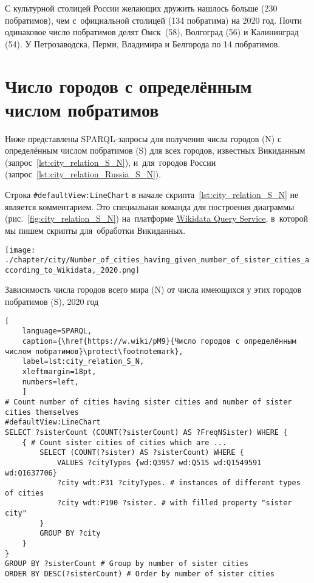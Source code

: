 С культурной столицей России желающих дружить нашлось больше (230 побратимов), 
чем с~официальной столицей (134 побратима) на 2020 год. 
Почти одинаковое число побратимов делят Омск~(58), Волгоград (56) и Калининград (54). 
У Петрозаводска, Перми, Владимира и Белгорода по 14 побратимов.




\section{Число городов с определённым числом побратимов}

Ниже представлены SPARQL-запросы для получения числа городов (N) 
с определённым числом побратимов (S) для всех городов, известных Викиданным 
(запрос~\ref{lst:city_relation_S_N}), 
и~для~городов России (запрос~\ref{lst:city_relation_Russia_S_N}).

Строка \lstinline|#defaultView:LineChart| 
в начале скрипта~\ref{lst:city_relation_S_N} не является комментарием. 
Это специальная команда для построения диаграммы (рис.~\ref{fig:city_relation_S_N}) 
на~платформе \href{https://query.wikidata.org}{Wikidata Query Service}, 
в~которой мы пишем скрипты для~обработки Викиданных.

\begin{marginfigure}[22pt]
    \texttt{[image: ./chapter/city/Number\_of\_cities\_having\_given\_number\_of\_sister\_cities\_according\_to\_Wikidata,\_2020.png]}%
    \vspace{-18pt}
    \caption[Зависимость числа городов от числа имеющихся побратимов, 2020 год.]
    {Зависимость числа городов всего мира (N) от числа имеющихся у этих городов побратимов (S), 2020 год}%
\label{fig:city_relation_S_N}
\end{marginfigure}

\begin{lstlisting}[ 
    language=SPARQL, 
    caption={\href{https://w.wiki/pM9}{Число городов с определённым числом побратимов}\protect\footnotemark},
    label=lst:city_relation_S_N,
    xleftmargin=18pt, 
    numbers=left,
    ]
# Count number of cities having sister cities and number of sister cities themselves
#defaultView:LineChart
SELECT ?sisterCount (COUNT(?sisterCount) AS ?FreqNSister) WHERE {                                                                         
	{ # Count sister cities of cities which are ...
		SELECT (COUNT(?sister) AS ?sisterCount) WHERE {        
			VALUES ?cityTypes {wd:Q3957 wd:Q515 wd:Q1549591 wd:Q1637706}
			?city wdt:P31 ?cityTypes. # instances of different types of cities
			?city wdt:P190 ?sister. # with filled property "sister city"
		}
		GROUP BY ?city
	}
}
GROUP BY ?sisterCount # Group by number of sister cities                                     
ORDER BY DESC(?sisterCount) # Order by number of sister cities   
\end{lstlisting}
\footnotetext[15][-52pt]{%
Получено: 90 вариантов числа братских городов в мире в 2020 году. Ссылка на~SPARQL-запрос: \href{https://w.wiki/pM9}{https://w.wiki/pM9}.}

